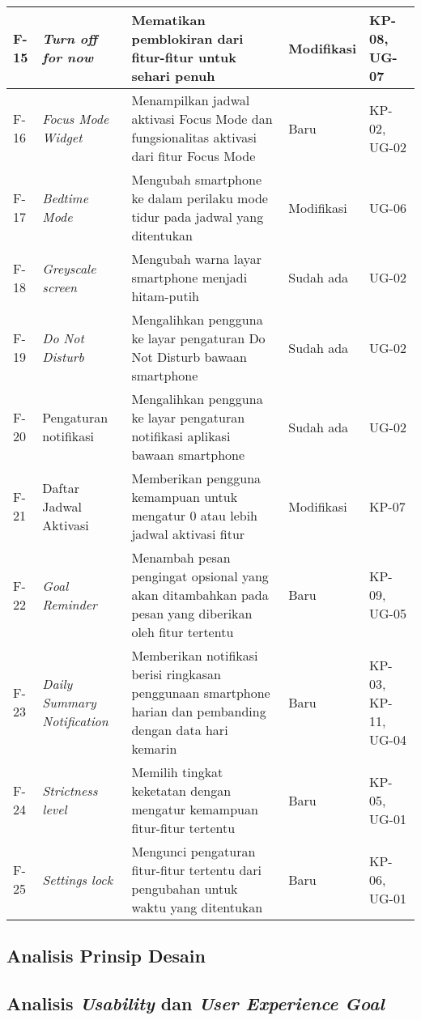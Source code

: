 \begin{small}
\begin{longtable}[c]{|W{c}{0.06\textwidth}|>{\cccnormspacingcenter}m{0.15\textwidth}|>{\cccnormspacing}m{0.35\textwidth}|>{\cccnormspacingcenter}m{0.12\textwidth}|>{\cccnormspacingcenter}m{0.16\textwidth}|}
  F-15 & \textit{Turn off for now} & Mematikan pemblokiran dari fitur-fitur untuk sehari penuh & Modifikasi & KP-08, UG-07 \\ \hline
  F-16 & \textit{Focus Mode Widget} & Menampilkan jadwal aktivasi Focus Mode dan fungsionalitas aktivasi dari fitur Focus Mode & Baru & KP-02, UG-02 \\ \hline
  F-17 & \textit{Bedtime Mode} & Mengubah smartphone ke dalam perilaku mode tidur pada jadwal yang ditentukan & Modifikasi & UG-06 \\ \hline
  F-18 & \textit{Greyscale screen} & Mengubah warna layar smartphone menjadi hitam-putih & Sudah ada & UG-02 \\ \hline
  F-19 & \textit{Do Not Disturb} & Mengalihkan pengguna ke layar pengaturan Do Not Disturb bawaan smartphone & Sudah ada & UG-02 \\ \hline
  F-20 & Pengaturan notifikasi & Mengalihkan pengguna ke layar pengaturan notifikasi aplikasi bawaan smartphone & Sudah ada & UG-02 \\ \hline
  F-21 & Daftar Jadwal Aktivasi & Memberikan pengguna kemampuan untuk mengatur 0 atau lebih jadwal aktivasi fitur & Modifikasi & KP-07 \\ \hline
  F-22 & \textit{Goal Reminder} & Menambah pesan pengingat opsional yang akan ditambahkan pada pesan yang diberikan oleh fitur tertentu & Baru & KP-09, UG-05 \\ \hline
  F-23 & \textit{Daily Summary Notification} & Memberikan notifikasi berisi ringkasan penggunaan smartphone harian dan pembanding dengan data hari kemarin & Baru & KP-03, KP-11, UG-04 \\ \hline
  F-24 & \textit{Strictness level} & Memilih tingkat keketatan dengan mengatur kemampuan fitur-fitur tertentu & Baru & KP-05, UG-01 \\ \hline
  F-25 & \textit{Settings lock} & Mengunci pengaturan fitur-fitur tertentu dari pengubahan untuk waktu yang ditentukan & Baru & KP-06, UG-01 \\ \hline

\end{longtable}
\end{small}
\justifying
\FloatBarrier

\subsection{Analisis Prinsip Desain}


\subsection{Analisis \textit{Usability} dan \textit{User Experience Goal}}




